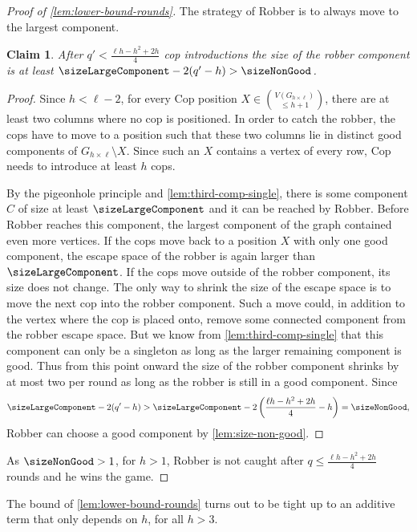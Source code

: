 \documentclass{lmcs}
\theoremstyle{plain}\newtheorem{claim}[thm]{Claim}   %
\newenvironment{claimproof}{\begin{proof}}{\renewcommand{\qedsymbol}{\ensuremath{\blacksquare}}\end{proof}}
\newcommand{\grid}[2]{\ensuremath{G_{#1 \times #2}}}
\begin{document}
\begin{proof}[Proof of \autoref{lem:lower-bound-rounds}]
	The strategy of Robber is to always move to the largest component.
	\begin{claim}
		After $q'< \frac{\ell h - h^2 + 2h}{4}$ cop introductions the size of the robber component is at least $\sizeLargeComponent-2(q'-h) > \sizeNonGood$.
	\end{claim}
	\begin{claimproof}
		Since $h < \ell-2$, for every Cop position $X\in \binom{V(\grid{h}{\ell})}{\leq h+1}$, there are at least two columns where no cop is positioned.
		In order to catch the robber, the cops have to move to a position such that these two columns lie in distinct good components of $\grid{h}{\ell}\setminus X$.
		Since such an $X$ contains a vertex of every row, Cop needs to introduce at least $h$ cops.
		
		By the pigeonhole principle and \autoref{lem:third-comp-single}, there is some component $C$ of size at least $\sizeLargeComponent$ and it can be reached by Robber.
		Before Robber reaches this component, the largest component of the graph contained even more vertices.
		If the cops move back to a position $X$ with only one good component, the escape space of the robber is again larger than $\sizeLargeComponent$.
		If the cops move outside of the robber component, its size does not change.
		The only way to shrink the size of the escape space is to move the next cop into the robber component.
		Such a move could, in addition to the vertex where the cop is placed onto, remove some connected component from the robber escape space.
		But we know from \autoref{lem:third-comp-single} that this component can only be a singleton as long as the larger remaining component is good.
		Thus from this point onward the size of the robber component shrinks by at most two per round as long as the robber is still in a good component.
		Since 
		\begin{equation*}
			\sizeLargeComponent - 2(q' - h)> \sizeLargeComponent -2\left(\frac{\ell h - h^2 + 2h}{4} - h\right) = \sizeNonGood,
		\end{equation*}
		Robber can choose a good component by \autoref{lem:size-non-good}.
	\end{claimproof}
	
	As $\sizeNonGood>1$, for $h>1$, Robber is not caught after $q\leq \frac{\ell h - h^2 + 2h}{4}$ rounds and he wins the game.
\end{proof}

The bound of \autoref{lem:lower-bound-rounds} turns out to be tight up to an additive term that only depends on $h$, for all $h>3$.
\end{document}
